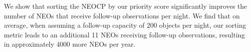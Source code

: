 \documentclass[twocolumn]{aastex631}
\begin{document}
We show that sorting the NEOCP by our priority score significantly improves the number of NEOs that receive follow-up observations per night. We find that on average, when assuming a follow-up capacity of 200 objects per night, our sorting metric leads to an additional 11 NEOs receiving follow-up observations, resulting in approximately 4000 more NEOs per year.\\\\\\\\\\\\\\\\\\\\\\\\\\\\\\\\\\\\\\\\\\\\\\\\


{}
\end{document}
